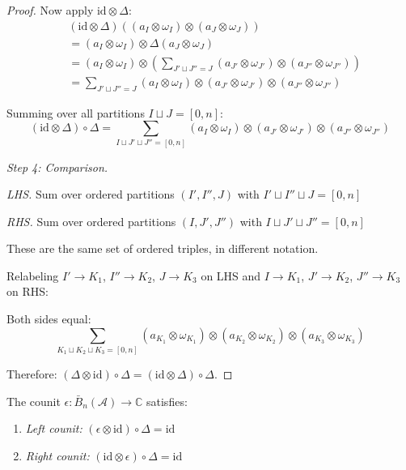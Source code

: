 \begin{proof}
Now apply $\text{id} \otimes \Delta$:
\begin{align*}
&(\text{id} \otimes \Delta)\left((a_I \otimes \omega_I) \otimes (a_J \otimes \omega_J)\right) \\
&= (a_I \otimes \omega_I) \otimes \Delta(a_J \otimes \omega_J) \\
&= (a_I \otimes \omega_I) \otimes \left(\sum_{J' \sqcup J'' = J} (a_{J'} \otimes \omega_{J'}) \otimes (a_{J''} \otimes \omega_{J''})\right) \\
&= \sum_{J' \sqcup J'' = J} (a_I \otimes \omega_I) \otimes (a_{J'} \otimes \omega_{J'}) \otimes (a_{J''} \otimes \omega_{J''})
\end{align*}

Summing over all partitions $I \sqcup J = [0,n]$:
\[(\text{id} \otimes \Delta) \circ \Delta = \sum_{I \sqcup J' \sqcup J'' = [0,n]} (a_I \otimes \omega_I) \otimes (a_{J'} \otimes \omega_{J'}) \otimes (a_{J''} \otimes \omega_{J''})\]

\smallskip\noindent\emph{Step 4: Comparison.}

\emph{LHS.} Sum over ordered partitions $(I', I'', J)$ with $I' \sqcup I'' \sqcup J = [0,n]$

\emph{RHS.} Sum over ordered partitions $(I, J', J'')$ with $I \sqcup J' \sqcup J'' = [0,n]$

These are the same set of ordered triples, in different notation.

Relabeling $I' \to K_1$, $I'' \to K_2$, $J \to K_3$ on LHS and $I \to K_1$, $J' \to K_2$, $J'' \to K_3$ on RHS:

Both sides equal:
\[\sum_{K_1 \sqcup K_2 \sqcup K_3 = [0,n]} (a_{K_1} \otimes \omega_{K_1}) \otimes (a_{K_2} \otimes \omega_{K_2}) \otimes (a_{K_3} \otimes \omega_{K_3})\]

Therefore: $(\Delta \otimes \text{id}) \circ \Delta = (\text{id} \otimes \Delta) \circ \Delta$.
\end{proof}

\begin{theorem}\label{thm:counit-axioms}
The counit $\epsilon: \bar{B}_n(\mathcal{A}) \to \mathbb{C}$ satisfies:
\begin{enumerate}
\item \emph{Left counit:} $(\epsilon \otimes \text{id}) \circ \Delta = \text{id}$
\item \emph{Right counit:} $(\text{id} \otimes \epsilon) \circ \Delta = \text{id}$
\end{enumerate}
\end{theorem}

